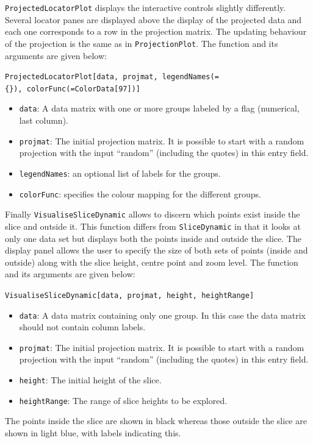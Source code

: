 \documentclass[]{interact}
\theoremstyle{plain}%
\theoremstyle{definition}
\theoremstyle{remark}
\providecommand{\tightlist}{%
  \setlength{\itemsep}{0pt}\setlength{\parskip}{0pt}}
\def\tightlist{}
\begin{document}
\texttt{ProjectedLocatorPlot} displays the interactive controls slightly
differently. Several locator panes are displayed above the display of
the projected data and each one corresponds to a row in the projection
matrix. The updating behaviour of the projection is the same as in
\texttt{ProjectionPlot}. The function and its arguments are given below:

\texttt{ProjectedLocatorPlot{[}data,\ projmat,\ legendNames(=\{\}),\ colorFunc(=ColorData{[}97{]}){]}}

\begin{itemize}
\tightlist
\item
  \texttt{data}: A data matrix with one or more groups labeled by a flag
  (numerical, last column).
\item
  \texttt{projmat}: The initial projection matrix. It is possible to
  start with a random projection with the input ``random'' (including
  the quotes) in this entry field.
\item
  \texttt{legendNames}: an optional list of labels for the groups.
\item
  \texttt{colorFunc}: specifies the colour mapping for the different
  groups.
\end{itemize}

Finally \texttt{VisualiseSliceDynamic} allows to discern which points
exist inside the slice and outside it. This function differs from
\texttt{SliceDynamic} in that it looks at only one data set but displays
both the points inside and outside the slice. The display panel allows
the user to specify the size of both sets of points (inside and outside)
along with the slice height, centre point and zoom level. The function
and its arguments are given below:

\texttt{VisualiseSliceDynamic{[}data,\ projmat,\ height,\ heightRange{]}}

\begin{itemize}
\tightlist
\item
  \texttt{data}: A data matrix containing only one group. In this case
  the data matrix should not contain column labels.
\item
  \texttt{projmat}: The initial projection matrix. It is possible to
  start with a random projection with the input ``random'' (including
  the quotes) in this entry field.
\item
  \texttt{height}: The initial height of the slice.
\item
  \texttt{heightRange}: The range of slice heights to be explored.
\end{itemize}

The points inside the slice are shown in black whereas those outside the
slice are shown in light blue, with labels indicating this.



\end{document}
